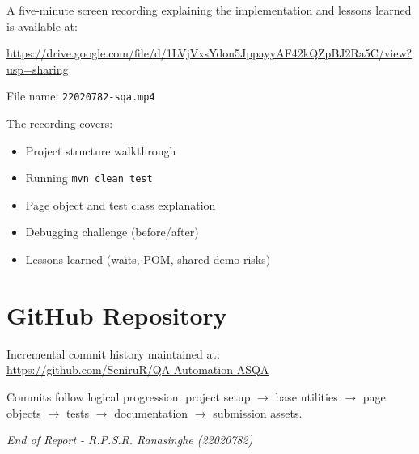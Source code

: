 ﻿\documentclass[11pt,a4paper]{article}
\begin{document}
A five-minute screen recording explaining the implementation and lessons learned is available at:

\begin{center}
\url{https://drive.google.com/file/d/1LVjVxsYdon5JppayyAF42kQZpBJ2Ra5C/view?usp=sharing}
\end{center}

\noindent File name: \texttt{22020782-sqa.mp4}

The recording covers:
\begin{itemize}[noitemsep]
  \item Project structure walkthrough
  \item Running \texttt{mvn clean test}
  \item Page object and test class explanation
  \item Debugging challenge (before/after)
  \item Lessons learned (waits, POM, shared demo risks)
\end{itemize}

\section{GitHub Repository}

Incremental commit history maintained at:\\
\url{https://github.com/SeniruR/QA-Automation-ASQA}

\noindent Commits follow logical progression: project setup $\rightarrow$ base utilities $\rightarrow$ page objects $\rightarrow$ tests $\rightarrow$ documentation $\rightarrow$ submission assets.

\vfill
\begin{center}
\small\textit{End of Report - R.P.S.R. Ranasinghe (22020782)}
\end{center}
\end{document}
